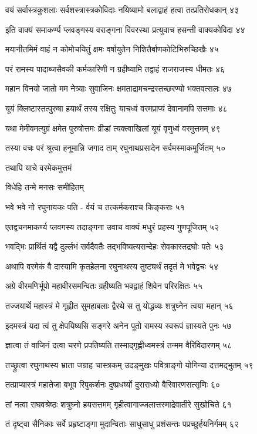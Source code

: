 वयं सर्वास्त्रकुशलाः सर्वशस्त्रास्त्रकोविदाः
नयिष्यामो बलाद्वाहं हत्वा तत्प्रतिरोधकान् ४३

इति वाक्यं समाकर्ण्य प्लवङ्गस्य वराङ्गना
विवरस्था प्रत्युवाच हसन्ती वाक्यकोविदा ४४

मयानीतमिमं वाहं न कोमोचयितुं क्षमः
वर्षायुतेन निशितैर्बाणकोटिभिरुच्छिखैः ४५

परं रामस्य पादाब्जसैवकी कर्मकारिणी
न ग्रहीष्यामि तद्वाहं राजराजस्य धीमतः ४६

महान विनयो जातो मम नेत्र्याः सुवाजिनः
क्षमताद्रामचन्द्रस्तच्छरण्यो भक्तवत्सलः ४७

यूयं क्लिष्टास्तत्पुरुषा हयार्थं तस्य रक्षितुः
याचध्वं वरमप्राप्यं देवानामपि सत्तमाः ४८

यथा मेमीवमत्युग्रं क्षमेत पुरुषोत्तमः
व्रीडां त्यक्त्वाखिलां यूयं वृणुध्वं वरमुत्तमम् ४९

तस्या वचः परं श्रुत्वा हनूमान्नि जगाद ताम्
रघुनाथप्रसादेन सर्वमस्माकमूर्जितम् ५०

तथापि याचे वरमेकमुत्तमं

विधेहि तन्मे मनसः समीहितम्

भवे भवे नो रघुनायकः पति -
र्वयं च तत्कर्मकराश्च किङ्कराः ५१

एतद्वचनमाकर्ण्य प्लवगस्य तदाङ्गना
उवाच वाक्यं मधुरं प्रहस्य गुणपूजितम् ५२

भवद्भिः प्रार्थितं यद्वै दुर्ल्लभं सर्वदैवतैः
तद्भविष्यत्यसन्देहः सेवकास्तद्रघोः पतेः ५३

अथापि वरमेकं वै दास्यामि कृतहेलना
रघुनाथस्य तुष्ट्यर्थं तदृतं मे भवेद्वचः ५४

अग्रे वीरमणिर्भूपो महावीरसमन्वितः
ग्रहीष्यति भवद्वाहं शिवेन परिरक्षितः ५५

तज्जयार्थे महास्त्रं मे गृह्णीत सुमहाबलाः
द्वैरथे स तु योद्धव्यः शत्रुघ्नेन त्वया महान् ५६

इदमस्त्रं यदा त्वं तु क्षेपयिष्यसि सङ्गरे
अनेन पूतो रामस्य स्वरूपं ज्ञास्यते पुनः ५७

ज्ञात्वा तं वाजिनं दत्वा चरणे प्रपतिष्यति
तस्माद्गृह्णीध्वमस्त्रं तन्मम वैरिविदारणम् ५८

तच्छ्रुत्वा रघुनाथस्य भ्राता जग्राह चास्त्रकम्
उदङ्मुखः पवित्राङ्गो योगिन्या दत्तमद्भुतम् ५९

तत्प्राप्यास्त्रं महातेजा बभूव रिपुकर्शनः
दुष्प्रधर्ष्यो दुराराध्यो वैरिवारणसत्सृणिः ६०

तां नत्वा राघवश्रेष्ठः शत्रुघ्नो हयसत्तमम्
गृहीत्वागाज्जलात्तस्माद्रेवातीरे सुखोचिते ६१

तं दृष्ट्वा सैनिकाः सर्वे प्रहृष्टाङ्गा मुदान्विताः
साधुसाधु प्रशंसन्तः पप्रच्छुर्हयनिर्गमम् ६२

